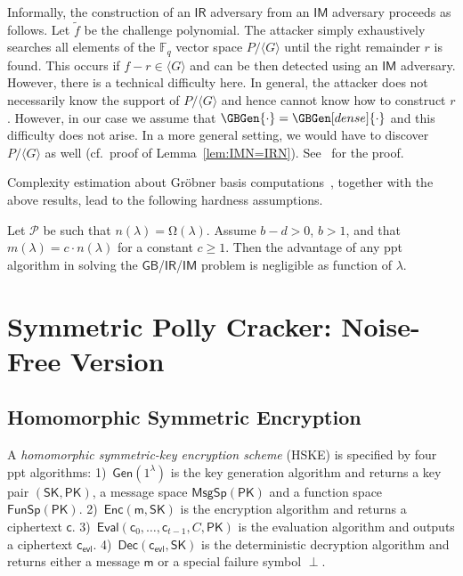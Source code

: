 \documentclass[draft]{llncs}
\newcommand{\heading}[1]{{\vspace{6pt}\noindent\sc{#1.}}}
\newcommand{\ring}[1]{\mathbb{#1}}
\newcommand{\F}{\ensuremath{\ring{F}}\xspace}
\newcommand{\ideal}[1]{\ensuremath{\langle #1 \rangle}\xspace}
\newcommand{\GB}{\ensuremath{\mathsf{GB}}\xspace}
\newcommand{\IR}{\ensuremath{\mathsf{IR}}\xspace}
\newcommand{\IM}{\ensuremath{\mathsf{IM}}\xspace}
\newcommand{\FunSp}{\ensuremath{\mathsf{FunSp}}}
\newcommand{\secpar}{\lambda}
\newcommand{\Gen}{\mathsf{Gen}}
\newcommand{\Enc}{\mathsf{Enc}}
\newcommand{\Eval}{\mathsf{Eval}}
\newcommand{\Dec}{\mathsf{Dec}}
\newcommand{\SK}{\mathsf{SK}}
\newcommand{\PK}{\mathsf{PK}}
\newcommand{\msg}{\mathsf{m}}
\newcommand{\cph}{\mathsf{c}}
\newcommand{\MsgSp}{\mathsf{MsgSp}}
\newcommand{\Circt}{C}
\begin{document}
Informally, the construction of an \IR adversary from an \IM adversary proceeds as follows. Let $\tilde{f}$ be the challenge polynomial. The attacker simply exhaustively searches all elements of the $\F_q$ vector space $P/\ideal{G}$ until the right remainder $r$ is found. This occurs if $f - r \in \ideal{G}$ and can be then detected using an \IM adversary. However, there is a technical difficulty here. In general, the attacker does not necessarily know the support of $P/\ideal{G}$ and hence cannot know how to construct $r$. However, in our case we assume that $\GBGen{\cdot} = \GBGen[dense]{\cdot}$ and this difficulty does not arise. 
In a more general setting, we would have to discover $P/\ideal{G}$ as well (cf.\ proof of Lemma~\ref{lem:IMN=IRN}). See~\cite{full} for the proof. 

\smallskip
Complexity estimation about Gröbner basis computations~\cite{full}, together with the above results, lead to the following hardness assumptions.

\begin{definition}
\label{def.GB.assump}
Let $\mathcal{P}$ be such that $n(\secpar)=\mathrm{\Omega}(\secpar)$. Assume $b-d >0$, $b>1$, and that $m(\secpar) = c\cdot n(\secpar)$ for a constant $c \ge 1$. Then the advantage of any ppt algorithm in solving the \GB/\IR/\IM problem is negligible as function of $\secpar$. 
\end{definition}


\vspace{-4mm} \section{Symmetric Polly Cracker: Noise-Free Version} \vspace{-2mm} \label{sec:pollycracker}
 \subsection{Homomorphic Symmetric Encryption}
\vspace{-3mm}

\heading{Syntax} A {\em homomorphic symmetric-key encryption scheme} (HSKE) is specified by four ppt algorithms: 1)~$\Gen(1^\secpar)$ is the key generation algorithm and returns a key pair $(\SK,\PK)$, a message space $\MsgSp(\PK)$ and a function space $\FunSp(\PK)$. 2)~$\Enc(\msg,\SK)$ is the encryption algorithm and returns a ciphertext $\cph$. 3)~$\Eval(\cph_0,\ldots,\cph_{t-1},\Circt,\PK)$ is the evaluation algorithm and outputs a ciphertext $\cph_{\mathsf{evl}}$. 4)~$\Dec(\cph_{\mathsf{evl}},\SK)$ is the deterministic decryption algorithm and returns either a message $\msg$ or a special failure symbol $\perp$. 
\end{document}
